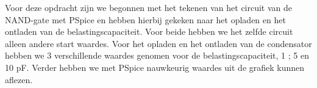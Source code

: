 \documentclass{article}
\begin{document}
Voor deze opdracht zijn we begonnen met het tekenen van het circuit van de NAND-gate met PSpice en hebben hierbij gekeken naar het opladen en het ontladen van de belastingscapaciteit. Voor beide hebben we het zelfde circuit alleen andere start waardes. Voor het opladen en het ontladen van de condensator hebben we 3 verschillende waardes genomen voor de belastingscapaciteit, 1 ; 5 en 10 pF. Verder hebben we met PSpice nauwkeurig waardes uit de grafiek kunnen aflezen.
\end{document}
